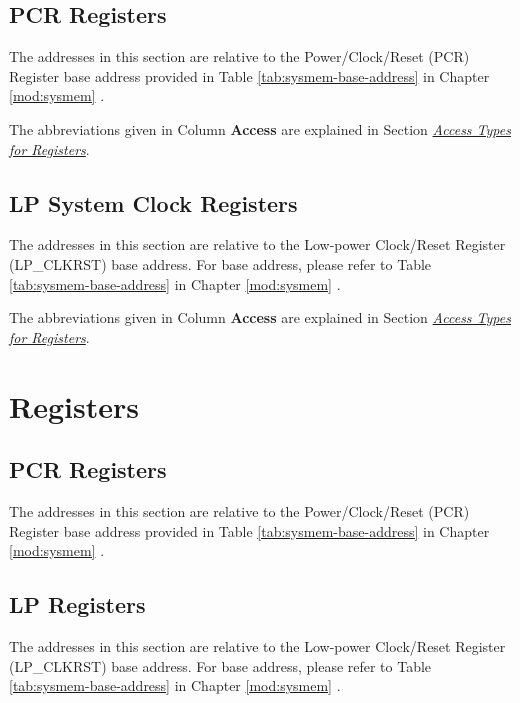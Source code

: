 \documentclass[main\_\_EN.tex]{subfiles}
\begin{document}
\subsection{PCR Registers} \label{sec:resclk-pcr-reg}

The addresses in this section are relative to the Power/Clock/Reset (PCR) Register base address provided in Table \ref{tab:sysmem-base-address} in Chapter \ref{mod:sysmem} \textit{}.

The abbreviations given in Column \textbf{Access} are explained in Section \hyperref[glossary-access-types]{\textit{Access Types for Registers}}.



\subsection{LP System Clock Registers}

The addresses in this section are relative to the Low-power Clock/Reset Register (LP\_CLKRST) base address. For base address, please refer to Table  \ref{tab:sysmem-base-address} in Chapter \ref{mod:sysmem} \textit{}.

The abbreviations given in Column \textbf{Access} are explained in Section \hyperref[glossary-access-types]{\textit{Access Types for Registers}}.







\section{Registers}

\subsection{PCR Registers}


The addresses in this section are relative to the Power/Clock/Reset (PCR) Register base address provided in Table \ref{tab:sysmem-base-address} in Chapter  \ref{mod:sysmem} \textit{}.





\subsection{LP Registers}


The addresses in this section are relative to the Low-power Clock/Reset Register (LP\_CLKRST) base address. For base address, please refer to Table  \ref{tab:sysmem-base-address} in Chapter \ref{mod:sysmem} \textit{}.



\end{document}
